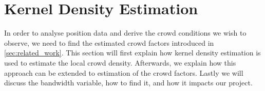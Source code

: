 \section{Kernel Density Estimation}

In order to analyse position data and derive the crowd conditions we wish to observe, we need to find the estimated crowd factors introduced in \cref{sec:related_work}. This section will first explain how kernel density estimation is used to estimate the local crowd density. Afterwards, we explain how this approach can be extended to estimation of the crowd factors. Lastly we will discuss the bandwidth variable, how to find it, and how it impacts our project.





